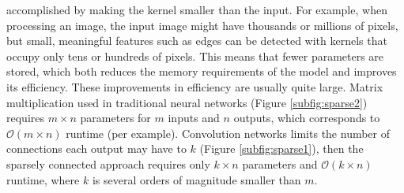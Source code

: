 \documentclass[12pt]{report}
\numberwithin{equation}{section}
\begin{document}
accomplished by making the kernel smaller than the input. For example, when processing   an image, the input image might have thousands or millions of pixels, but small, meaningful features such as edges can be detected with kernels that occupy only tens or hundreds of pixels. This means that fewer parameters are stored, which both reduces the memory requirements of the model and improves its efficiency. These improvements in efficiency are usually quite large. Matrix multiplication used in traditional neural networks (Figure \ref{subfig:sparse2}) requires $m \times n$ parameters for $m$ inputs and $n$ outputs, which corresponds to $\mathcal{O}(m \times n)$ runtime (per example). Convolution networks limits the number of connections each output may have to $k$ (Figure \ref{subfig:sparse1}), then the sparsely connected approach requires only $k \times n$ parameters and $\mathcal{O}(k \times n)$ runtime, where $k $ is several orders of magnitude smaller than $m$. 
\end{document}
